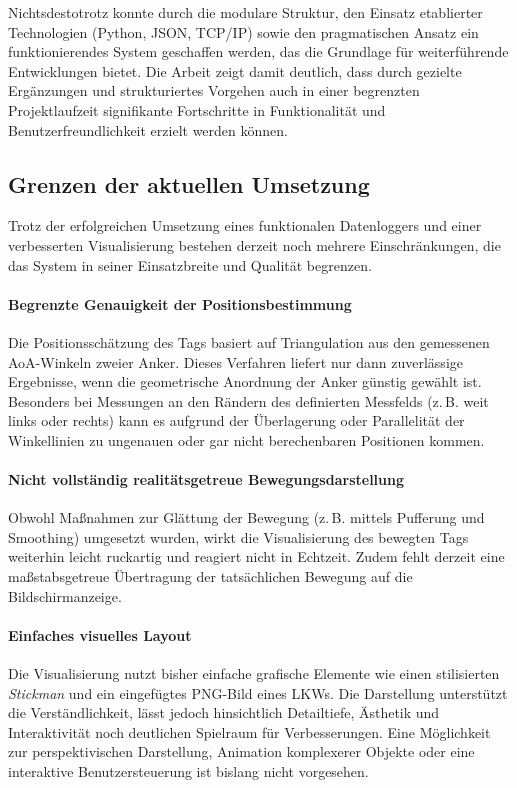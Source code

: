 \documentclass[a4paper, 12pt]{article} %
\begin{document}
Nichtsdestotrotz konnte durch die modulare Struktur, den Einsatz etablierter Technologien (Python, JSON, TCP/IP) sowie den pragmatischen Ansatz ein 
funktionierendes System geschaffen werden, das die Grundlage für weiterführende Entwicklungen bietet. Die Arbeit zeigt damit deutlich, dass durch 
gezielte Ergänzungen und strukturiertes Vorgehen auch in einer begrenzten Projektlaufzeit signifikante Fortschritte in Funktionalität und 
Benutzerfreundlichkeit erzielt werden können.

\subsection{Grenzen der aktuellen Umsetzung}

Trotz der erfolgreichen Umsetzung eines funktionalen Datenloggers und einer verbesserten Visualisierung bestehen derzeit noch mehrere Einschränkungen, 
die das System in seiner Einsatzbreite und Qualität begrenzen.

\paragraph{Begrenzte Genauigkeit der Positionsbestimmung} 
Die Positionsschätzung des Tags basiert auf Triangulation aus den gemessenen AoA-Winkeln zweier Anker. Dieses Verfahren liefert nur dann 
zuverlässige Ergebnisse, wenn die geometrische Anordnung der Anker günstig gewählt ist. Besonders bei Messungen an den Rändern des definierten 
Messfelds (z.\,B. weit links oder rechts) kann es aufgrund der Überlagerung oder Parallelität der Winkellinien zu ungenauen oder gar nicht 
berechenbaren Positionen kommen.

\paragraph{Nicht vollständig realitätsgetreue Bewegungsdarstellung}
Obwohl Maßnahmen zur Glättung der Bewegung (z.\,B. mittels Pufferung und Smoothing) umgesetzt wurden, wirkt die Visualisierung des bewegten 
Tags weiterhin leicht ruckartig und reagiert nicht in Echtzeit. Zudem fehlt derzeit eine maßstabsgetreue Übertragung der tatsächlichen Bewegung 
auf die Bildschirmanzeige.

\paragraph{Einfaches visuelles Layout}
Die Visualisierung nutzt bisher einfache grafische Elemente wie einen stilisierten \textit{Stickman} und ein eingefügtes PNG-Bild eines LKWs. 
Die Darstellung unterstützt die Verständlichkeit, lässt jedoch hinsichtlich Detailtiefe, Ästhetik und Interaktivität noch deutlichen Spielraum 
für Verbesserungen. Eine Möglichkeit zur perspektivischen Darstellung, Animation komplexerer Objekte oder eine interaktive Benutzersteuerung ist 
bislang nicht vorgesehen.
\end{document}
